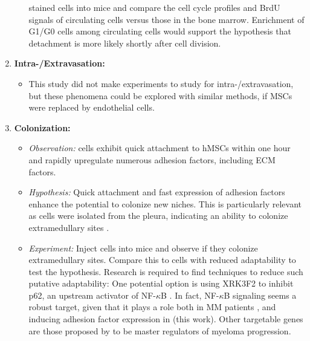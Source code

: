 \begin{enumerate}
\begin{itemize}
                        stained \INA cells into mice and compare the cell cycle
                        profiles and BrdU signals of circulating cells versus
                        those in the bone marrow. Enrichment of G1/G0 cells
                        among circulating cells would support the hypothesis
                        that detachment is more likely shortly after cell
                        division.
            \end{itemize}
      \item \textbf{Intra-/Extravasation:}
            \begin{itemize}
                  \item This study did not make experiments to study for
                        intra-/extravasation, but these phenomena could be
                        explored with similar methods, if MSCs were replaced by
                        endothelial cells.
            \end{itemize}
      \item \textbf{Colonization:}
            \begin{itemize}
                  \item \textit{Observation:} \INA cells exhibit quick
                        attachment to \acp{hMSC} within one hour and rapidly
                        upregulate numerous adhesion factors, including \ac{ECM}
                        factors.
                  \item \textit{Hypothesis:} Quick attachment and fast
                        expression of adhesion factors enhance the potential to
                        colonize new niches. This is particularly relevant as \INA
                        cells were isolated from the pleura, indicating an ability to
                        colonize extramedullary sites
                        \cite{burgerGp130RasMediated2001c}.
                  \item \textit{Experiment:} Inject \INA cells into mice and
                        observe if they colonize extramedullary sites. Compare
                        this to \INA cells with reduced adaptability to test the
                        hypothesis. Research is required to find techniques to
                        reduce such putative adaptability: One potential option
                        is using XRK3F2 to inhibit p62, an upstream activator of
                        NF-$\kappa$B \cite{adamikXRK3F2InhibitionP62ZZ2018}. In
                        fact, NF-$\kappa$B signaling seems a robust target,
                        given that it plays a role both in MM patients
                        \cite{sarinEvaluatingEfficacyMultiple2020}, and inducing
                        adhesion factor expression in \INA (this work). Other
                        targetable genes are those proposed by
                        \citet{shenProgressionSignatureUnderlies2021} to be
                        master regulators of myeloma progression.
            \end{itemize}
\end{enumerate}


